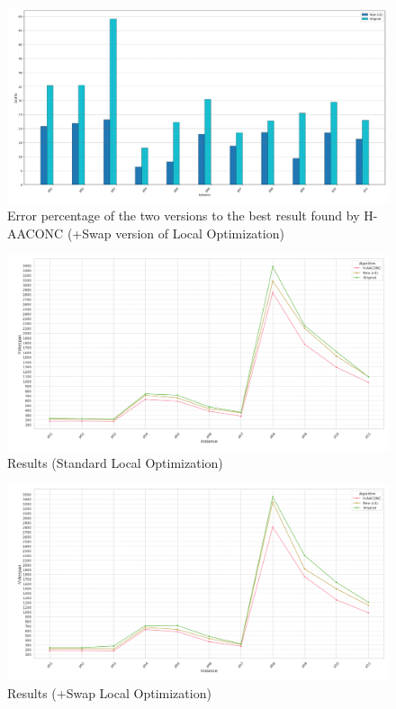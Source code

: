 \documentclass{article}
\begin{document}
	\;
	\begin{figure}[h]
		\caption[width=\textwidth]{Error percentage of the two versions to the best result found by H-AACONC (+Swap version of  Local Optimization)}
		\includegraphics[width=\textwidth]{gaps_to_Hybrid_+Swap}
		\centering
	\end{figure}
	\begin{figure}[h]
		\caption[width=\textwidth]{Results (Standard Local Optimization)}
		\includegraphics[width=\textwidth]{best_results_all_Standard}
		\centering
	\end{figure}
	\begin{figure}[h]
		\caption[width=\textwidth]{Results (+Swap Local Optimization)}
		\includegraphics[width=\textwidth]{best_results_all_+Swap}
		\centering
	\end{figure}
	
\end{document}
